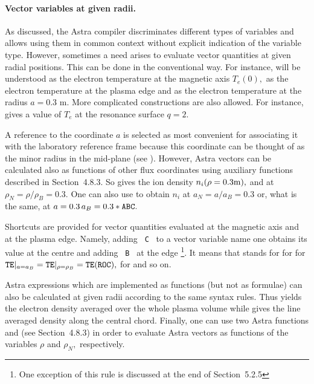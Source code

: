 \paragraph{Vector variables at given radii.}

As discussed, the Astra compiler discriminates different types
of variables and allows using them in common context without explicit 
indication of the variable type.
However, sometimes a need arises to evaluate vector quantities at
given radial positions. 
This can be done in the conventional way.
For instance,  will be understood as the electron temperature
at the magnetic axis $T_e(0),$  as the electron temperature
at the plasma edge and  as the electron temperature at the
radius $a=$0.3 m.
More complicated constructions are also allowed.
For instance,  gives a value of $T_e$ at the
resonance surface $q=2.$

A reference to the coordinate $a$ is selected as most convenient for 
associating it with the laboratory reference frame because this
coordinate can be thought of as the minor radius in the mid-plane
(see ).
However, Astra vectors can be calculated also as functions of other
flux coordinates using auxiliary functions described in Section~4.8.3. 
So  gives the ion density $n_i(\rho=0.3\rm m),$
and  at $\rho_N=\rho/\rho_B=0.3.$
One can also use  to obtain $n_i$ at $a_N=a/a_B=0.3$ 
or, what is the same, at $a=0.3\,a_B=0.3\tt*ABC.$ 

Shortcuts are provided for vector quantities evaluated at the magnetic
axis and at the plasma edge. 
Namely, adding {\tt~C~} to a vector variable name one obtains its
value at the centre and adding {\tt~B~} at the edge
\footnote{One exception of this rule is discussed at the end of 
Section~5.2.5}.
It means that  stands for   for 
  for 
${\tt TE}|_{a=a_B}={\tt TE}|_{\rho=\rho_B}=\tt TE(ROC),$ 
 for  and so on.

Astra expressions which are implemented as functions (but not as
formulae) can also be calculated at given radii according to the same
syntax rules.
Thus  yields the electron density averaged over the whole 
plasma volume while  gives the line averaged density along 
the central chord.
Finally, one can use two Astra functions  and  (see 
Section~4.8.3) in order to evaluate Astra vectors as functions of
the variables $\rho$ and $\rho_N,$ respectively.

